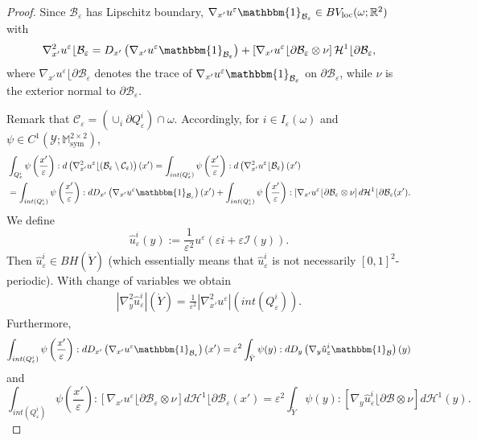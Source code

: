 \documentclass[reqno,10pt]{amsart}
\numberwithin{equation}{section}
\theoremstyle{remark}
\newcommand{\calB}{\mathcal{B}}
\newcommand{\calC}{\mathcal{C}}
\newcommand{\calH}{\mathcal{H}}
\newcommand{\calI}{\mathcal{I}}
\newcommand{\M}{\mathbb{M}}
\newcommand{\R}{\mathbb{R}}
\newcommand{\calY}{\mathcal{Y}}
\DeclareMathOperator{\sym}{sym}
\newcommand{\eps}{\varepsilon}
\newcommand{\mres}[1]{\lfloor{#1}}
\newcommand{\charfun}[1]{\mathbbm{1}_{#1}}
\newcommand{\D}{\nabla}
\begin{document}
\begin{proof}
Since $\calB_\eps$ has Lipschitz boundary, $\nabla_{x'}u^\eps \charfun{\calB_\eps} \in BV_{\rm loc}(\omega;\R^2)$ with
\begin{equation*}
	{\D}^2_{x'}u^\eps\mres{\calB_\eps} = D_{x'}\left(\nabla_{x'}u^\eps \charfun{\calB_\eps}\right) + \left[\nabla_{x'}u^\eps\mres{\partial\calB_\eps} \otimes \nu\right] \calH^{1}\mres{\partial\calB_\eps},
\end{equation*}
where $\nabla_{x'}u^\eps \mres{\partial\calB_\eps}$ denotes the trace of $\nabla_{x'}u^\eps \charfun{\calB_\eps}$ on $\partial\calB_\eps$, while $\nu$ is the exterior normal to $\partial\calB_\eps$. 

Remark that $\calC_\eps = \left( \cup _i \partial Q_\eps^i\right) \cap \omega$. 
Accordingly, for $i \in I_\eps(\omega)$ and $\psi \in C^1(\calY;\M^{2 \times 2}_{\sym})$,
\begin{align*}
	& \int_{Q_\eps^i} \psi\left(\frac{x'}{\eps}\right) : d\left({\D}^2_{x'}u^\eps\mres{(\calB_\eps \setminus \calC_\eps)}\right)(x')
	= \int_{int(Q_\eps^i)} \psi\left(\frac{x'}{\eps}\right) : d\left({\D}^2_{x'}u^\eps\mres{\calB_\eps}\right)(x')\\
	& = \int_{int(Q_\eps^i)} \psi\left(\frac{x'}{\eps}\right) : dD_{x'}\left(\nabla_{x'}u^\eps \charfun{\calB_\eps}\right)(x')
	+ \int_{int(Q_\eps^i)} \psi\left(\frac{x'}{\eps}\right) : \left[\nabla_{x'}u^\eps\mres{\partial\calB_\eps} \otimes \nu\right] d\calH^{1}\mres{\partial\calB_\eps}(x').
\end{align*}
We define 
\[
	\hat{u}_\eps^i(y) := \frac{1}{\eps^2} u^\eps\left(\eps i+\eps \calI(y)\right).
\]
Then $\hat{u}_\eps^i \in BH(\mathring{Y})$ (which essentially means that $\hat{u}_\eps^i$ is not necessarily $[0,1]^2$-periodic).
With change of variables we obtain
\begin{align} \label{BH total variation estimate}
	|{\D}^2_{y}\hat{u}_\eps^i|(\mathring{Y}) = \frac{1}{\eps^2} |{\D}^2_{x'}u^\eps|\left(int(Q_\eps^i)\right).
\end{align}
Furthermore,
\begin{equation*}
	\int_{int(Q_\eps^i)} \psi\left(\frac{x'}{\eps}\right) : dD_{x'}\left(\nabla_{x'}u^\eps \charfun{\calB_\eps}\right)(x') = \eps^2 \int_{\mathring{Y}} \psi(y) : dD_{y}\left(\nabla_{y}\hat{u}_\eps^i \charfun{\calB}\right)(y)
\end{equation*}
and
\begin{equation*}
	\int_{int(Q_\eps^i)} \psi\left(\frac{x'}{\eps}\right) : \left[\nabla_{x'}u^\eps\mres{\partial\calB_\eps} \otimes \nu\right] d\calH^{1}\mres{\partial\calB_\eps}(x') = \eps^2 \int_{\mathring{Y}} \psi(y) : \left[\nabla_{y}\hat{u}_\eps^i\mres{\partial\calB} \otimes \nu\right] d\calH^{1}(y).

\end{equation*}
\end{proof}
\end{document}
